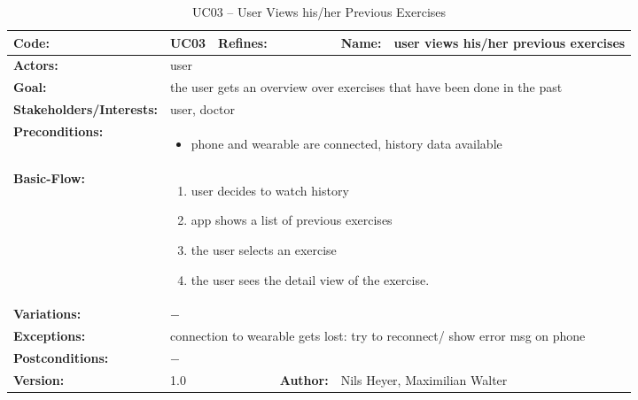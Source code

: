 \begin{table}[H]
	\begin{tabular}{|l|l|l|l|l|l|} \hline
		\textbf{Code:} & UC03 & \textbf{Refines:} &  & \textbf{Name:} & user views his/her previous exercises \\ \hline
		\textbf{Actors:} & \multicolumn{5}{l|}{user} \\ \hline
		\textbf{Goal:} & \multicolumn{5}{l|}{the user gets an overview over exercises that have been done in the past} \\ \hline
		\textbf{Stakeholders/Interests:} & \multicolumn{5}{l|}{user, doctor} \\ \hline
		\textbf{Preconditions:} & \multicolumn{5}{l|}{\parbox{0.75\textwidth}{
			\begin{itemize}[itemsep=-5]
				\item phone and wearable are connected, history data available
			\end{itemize}
		}} \\ \hline
		\textbf{Basic-Flow:} & \multicolumn{5}{l|}{\parbox{0.75\textwidth}{
			\begin{enumerate}[itemsep=-5]
				\item user decides to watch history
				\item app shows a list of previous exercises
				\item the user selects an exercise
				\item the user sees the detail view of the exercise.
			\end{enumerate}
		}} \\ \hline
		\textbf{Variations:} & \multicolumn{5}{l|}{\parbox{0.75\textwidth}{
			$-$
		}} \\ \hline
		\textbf{Exceptions:} & \multicolumn{5}{l|}{\parbox{0.75\textwidth}{
			connection to wearable gets lost: try to reconnect/ show error msg on phone
		}} \\ \hline
		\textbf{Postconditions:} & \multicolumn{5}{l|}{$-$} \\ \hline
		\textbf{Version:} & \multicolumn{2}{l|}{1.0} & \textbf{Author:} & \multicolumn{2}{l|}{Nils Heyer, Maximilian Walter} \\ \hline
	\end{tabular}
	\caption{UC03 -- User Views his/her Previous Exercises}
\end{table}